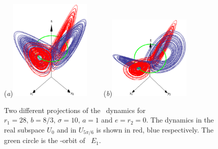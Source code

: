 \begin{figure}[t]
\begin{center}
  (\textit{a})\includegraphics[width=0.35\textwidth]{../figs/LorenzCoexA.eps}
~~~~(\textit{b})\includegraphics[width=0.35\textwidth]{../figs/LorenzCoexB.eps}
\end{center}
\caption[Complex Lorenz eq. coexisting attractors]{ Two different projections
of the \CLe\ dynamics 
for $r_1=28,\, b=8/3,\, \sigma=10,\, a=1$ and $e=r_2=0$. The dynamics in
the real subspace $U_0$ and in $U_{5\pi/6}$ is shown in red, blue respectively. The green circle
is the -orbit of \eqv\ $E_1$.
    }
\label{fig:LorenzCoex}
\end{figure}


